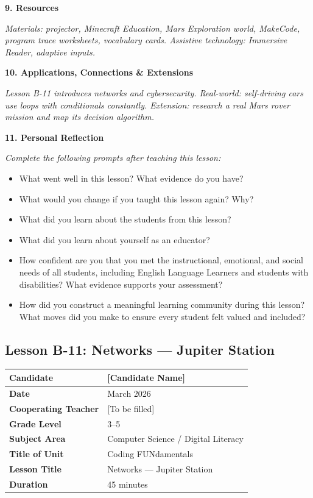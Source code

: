 \documentclass[11pt,letterpaper]{article}
\begin{document}
\textbf{9. Resources}

\textit{Materials: projector, Minecraft Education, Mars Exploration world, MakeCode, program trace worksheets, vocabulary cards. Assistive technology: Immersive Reader, adaptive inputs.}

\textbf{10. Applications, Connections \& Extensions}

\textit{Lesson B-11 introduces networks and cybersecurity. Real-world: self-driving cars use loops with conditionals constantly. Extension: research a real Mars rover mission and map its decision algorithm.}

\textbf{11. Personal Reflection}

\textit{Complete the following prompts after teaching this lesson:}

\begin{itemize}
  \item What went well in this lesson? What evidence do you have?

  \item What would you change if you taught this lesson again? Why?

  \item What did you learn about the students from this lesson?

  \item What did you learn about yourself as an educator?

  \item How confident are you that you met the instructional, emotional, and social needs of all students, including English Language Learners and students with disabilities? What evidence supports your assessment?

  \item How did you construct a meaningful learning community during this lesson? What moves did you make to ensure every student felt valued and included?
\end{itemize}

\newpage
\subsection{Lesson B-11: Networks --- Jupiter Station}
\label{sub:LessonB11NetworksJupiterStation}

\begin{longtable}{|L{0.28\textwidth}|L{0.65\textwidth}|}
\hline
\textbf{Candidate}  & [Candidate Name]  \\
\hline
\textbf{Date}  & March 2026  \\
\hline
\textbf{Cooperating Teacher}  & [To be filled]  \\
\hline
\textbf{Grade Level}  & 3--5  \\
\hline
\textbf{Subject Area}  & Computer Science / Digital Literacy  \\
\hline
\textbf{Title of Unit}  & Coding FUNdamentals  \\
\hline
\textbf{Lesson Title}  & Networks --- Jupiter Station  \\
\hline
\textbf{Duration}  & 45 minutes  \\
\hline
\end{longtable}
\end{document}
